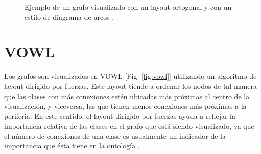 \begin{figure}[H]
	\centering
	\caption{Ejemplo de un grafo visualizado con un layout ortogonal y con un estilo de diagrama de arcos \cite{bekos2012smooth}.}
	\label{fig:ortogonal}
\end{figure}


\section{VOWL}
Los grafos son visualizados en VOWL \cite{lohmann2016visualizing}[Fig. \ref{fig:vowl}] utilizando un algoritmo de layout dirigido por fuerzas. Este layout tiende a ordenar los nodos de tal manera que las clases con más conexiones estén ubicadas más próximas al centro de la visualización, y viceversa, las que tienen menos conexiones más próximas a la periferia. En este sentido, el layout dirigido por fuerzas ayuda a reflejar la importancia relativa de las clases en el grafo que está siendo visualizado, ya que el número de conexiones de una clase es usualmente un indicador de la importancia que ésta tiene en la ontología \cite{peroni2008identifying}.

